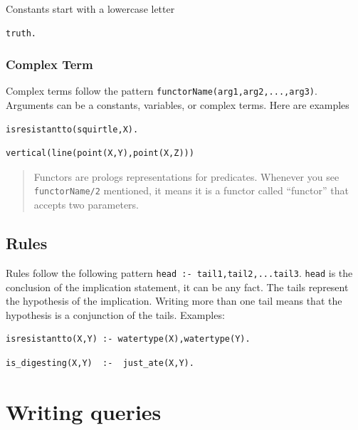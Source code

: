 Constants start with a lowercase letter

\begin{verbatim}
truth.
\end{verbatim}

\subsubsection{Complex Term}\label{prolog-cheat-sheet.md__complex-term}

Complex terms follow the pattern
\texttt{functorName(arg1,arg2,...,arg3)}. Arguments can be a constants,
variables, or complex terms. Here are examples

\begin{verbatim}
isresistantto(squirtle,X).
\end{verbatim}

\begin{verbatim}
vertical(line(point(X,Y),point(X,Z)))
\end{verbatim}

\begin{quote}
Functors are prologs representations for predicates. Whenever you see
\texttt{functorName/2} mentioned, it means it is a functor called
``functor'' that accepts two parameters.
\end{quote}

\subsection{Rules}\label{prolog-cheat-sheet.md__rules}

Rules follow the following pattern
\texttt{head\ :-\ tail1,tail2,...tail3}. \texttt{head} is the conclusion
of the implication statement, it can be any fact. The tails represent
the hypothesis of the implication. Writing more than one tail means that
the hypothesis is a conjunction of the tails. Examples:

\begin{verbatim}
isresistantto(X,Y) :- watertype(X),watertype(Y).
\end{verbatim}

\begin{verbatim}
is_digesting(X,Y)  :-  just_ate(X,Y).
\end{verbatim}

\section{Writing queries}\label{prolog-cheat-sheet.md__writing-queries}

